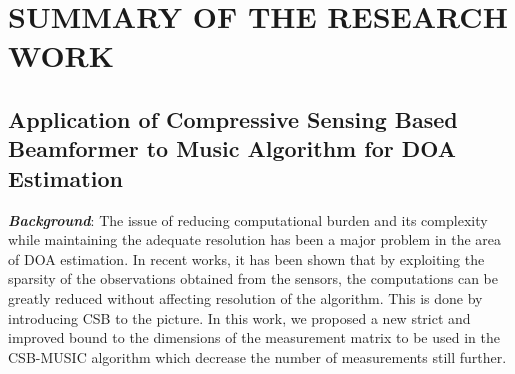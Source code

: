 \documentclass[12pt,a4paper]{article}
\theoremstyle{plain}
\theoremstyle{definition}
\begin{document}
\section{SUMMARY OF THE RESEARCH WORK}

\subsection{Application of Compressive Sensing Based Beamformer to Music Algorithm for DOA Estimation}
\textbf{\emph{Background}}: The issue of reducing computational burden and its complexity while maintaining the adequate resolution has been a major problem in the area of DOA estimation. In recent works, it has been shown that by exploiting the sparsity of the observations obtained from the sensors, the computations can be greatly reduced without affecting resolution of the algorithm. This is done by introducing CSB to the picture. In this work, we proposed a new strict and improved bound to the dimensions of the measurement matrix to be used in the CSB-MUSIC algorithm which decrease the number of measurements still further. 
\end{document}
